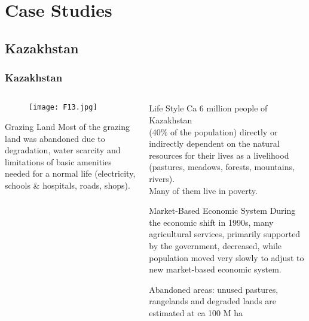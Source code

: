 \documentclass[pdflatex,compress,8pt,
	xcolor={dvipsnames,dvipsnames,svgnames,x11names,table},
	hyperref={colorlinks = true,
	breaklinks = true, 
	urlcolor = NavyBlue, 
	breaklinks = true}]{beamer}
\begin{document}
\section{Case Studies}
\subsection{Kazakhstan}
\begin{frame}\frametitle{Kazakhstan}

\begin{minipage}[0.4\textheight]{\textwidth}
\begin{columns}[T]
\begin{column}{0.5\textwidth}
\vspace{3em}
\begin{figure}[H]
	\centering
		\texttt{[image: F13.jpg]}
\end{figure}

\begin{block}{Grazing Land}
Most of the grazing land was abandoned due to degradation, water scarcity and limitations of
basic amenities needed for a normal life (electricity, schools \& hospitals, roads, shops).
\end{block}

\end{column}
\begin{column}{0.5\textwidth}

\vspace{2em}
\begin{alertblock}{Life Style}
Ca 6 million people of Kazakhstan \\(40\% of the population) directly or indirectly dependent on the natural resources for their lives as a livelihood (pastures, meadows, forests, mountains, rivers). \\
Many of them live in poverty.
\end{alertblock}

\begin{block}{Market-Based Economic System}
During the economic shift in 1990s, many agricultural services, primarily supported by the government, decreased, while population moved very slowly to adjust to new market-based economic system.
\end{block}

\begin{examples}{Abandoned areas:}
unused pastures, rangelands and degraded lands are \\estimated at ca 100 M ha
\end{examples}

\end{column}
\end{columns}
\end{minipage}

\end{frame}
\end{document}
